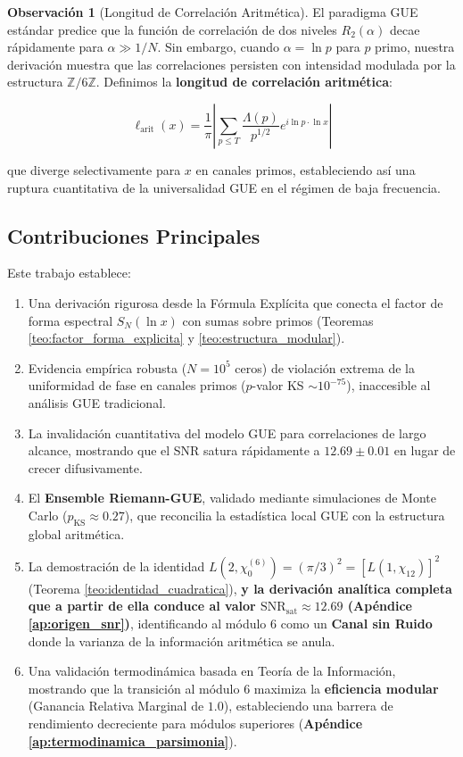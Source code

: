 \documentclass[12pt, a4paper]{article}
\theoremstyle{plain}
\theoremstyle{definition}
\newtheorem{observacion}[teorema]{Observación}
\theoremstyle{remark}
\begin{document}
\begin{observacion}[Longitud de Correlación Aritmética]
El paradigma GUE estándar predice que la función de correlación de dos niveles 
$R_2(\alpha)$ decae rápidamente para $\alpha \gg 1/N$. Sin embargo, cuando 
$\alpha = \ln p$ para $p$ primo, nuestra derivación muestra que las correlaciones 
persisten con intensidad modulada por la estructura $\mathbb{Z}/6\mathbb{Z}$.
Definimos la \textbf{longitud de correlación aritmética}:

\[
\ell_{\text{arit}}(x) = \frac{1}{\pi} \left| \sum_{p \leq T} \frac{\Lambda(p)}{p^{1/2}} e^{i\ln p \cdot \ln x} \right|
\]

que diverge selectivamente para $x$ en canales primos, estableciendo así 
una ruptura cuantitativa de la universalidad GUE en el régimen de baja frecuencia.
\end{observacion}

\subsection{Contribuciones Principales}
\label{subsec:contribuciones}

Este trabajo establece:
\begin{enumerate}[label=(\arabic*)]
\item Una derivación rigurosa desde la Fórmula Explícita que conecta el factor de forma espectral $S_N(\ln x)$ con sumas sobre primos (Teoremas \ref{teo:factor_forma_explicita} y \ref{teo:estructura_modular}).

\item Evidencia empírica robusta ($N=10^5$ ceros) de violación extrema de la uniformidad de fase en canales primos ($p$-valor KS $\sim 10^{-75}$), inaccesible al análisis GUE tradicional.

\item La invalidación cuantitativa del modelo GUE para correlaciones de largo alcance, mostrando que el SNR satura rápidamente a $12.69 \pm 0.01$ en lugar de crecer difusivamente.

\item El \textbf{Ensemble Riemann-GUE}, validado mediante simulaciones de Monte Carlo ($p_{\text{KS}} \approx 0.27$), que reconcilia la estadística local GUE con la estructura global aritmética.

\item La demostración de la identidad $L(2,\chi_0^{(6)}) = (\pi/3)^2 = [L(1,\chi_{12})]^2$ (Teorema \ref{teo:identidad_cuadratica}), \textbf{y la derivación analítica completa que a partir de ella conduce al valor $\mathrm{SNR}_{\mathrm{sat}} \approx 12.69$ (Apéndice \ref{ap:origen_snr})}, identificando al módulo 6 como un \textbf{Canal sin Ruido} donde la varianza de la información aritmética se anula.

\item Una validación termodinámica basada en Teoría de la Información, mostrando que la transición al módulo 6 maximiza la \textbf{eficiencia modular} (Ganancia Relativa Marginal de $1.0$), estableciendo una barrera de rendimiento decreciente para módulos superiores (\textbf{Apéndice \ref{ap:termodinamica_parsimonia}}).
\end{enumerate}
\end{document}
